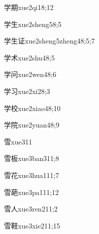 \begin{verbete}{学期}{xue2qi1}{8;12}
\end{verbete}

\begin{verbete}{学生}{xue2sheng5}{8;5}
\end{verbete}

\begin{verbete}{学生证}{xue2sheng5zheng4}{8;5;7}
\end{verbete}

\begin{verbete}{学术}{xue2shu4}{8;5}
\end{verbete}

\begin{verbete}{学问}{xue2wen4}{8;6}
\end{verbete}

\begin{verbete}{学习}{xue2xi2}{8;3}
\end{verbete}

\begin{verbete}{学校}{xue2xiao4}{8;10}
\end{verbete}

\begin{verbete}{学院}{xue2yuan4}{8;9}
\end{verbete}

\begin{verbete}{雪}{xue3}{11}
\end{verbete}

\begin{verbete}{雪板}{xue3ban3}{11;8}
\end{verbete}

\begin{verbete}{雪花}{xue3hua1}{11;7}
\end{verbete}

\begin{verbete}{雪葩}{xue3pa1}{11;12}
\end{verbete}

\begin{verbete}{雪人}{xue3ren2}{11;2}
\end{verbete}

\begin{verbete}{雪鞋}{xue3xie2}{11;15}
\end{verbete}

